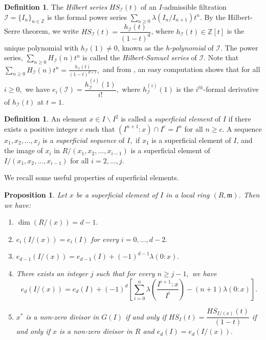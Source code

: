 \documentclass[reqno,a4paper,dvipsnames]{amsart}
\newcommand{\m}{\mathfrak{m} }
\newtheorem{proposition}[theorem]{Proposition}
\theoremstyle{definition}
\newtheorem{definition}[theorem]{Definition}
\begin{document}
  \begin{definition}
       The \textit{Hilbert series} $HS_{\mathcal{I}}(t)$ of an $I$-admissible filtration $\mathcal{I}=\{I_{n}\}_{n \in \mathbb Z}$  is the formal power series $\displaystyle \sum_{n \geq 0} \lambda(I_{n}/I_{n+1}) t^{n}$. 
    By the Hilbert-Serre theorem, we write 
    $ HS_{\mathcal{I}}(t)=\dfrac{h_{\mathcal{I}}(t)}{(1-t)^{d}}$,
where $h_{\mathcal{I}}(t) \in \mathbb{Z}[t]$ is the unique polynomial with $h_{\mathcal{I}}(1) \neq 0$, known as the \textit{h-polynomial} of $\mathcal{I}.$   The power series, $\displaystyle \sum_{n \geq 0} H_{\mathcal{I}}(n)t^{n}$ is called the \textit{Hilbert-Samuel series} of $\mathcal{I}.$ Note that $\displaystyle \sum_{n \geq 0} H_{\mathcal{I}}(n)t^{n}=\frac{h_{\mathcal{I}}(t)}{(1-t)^{d+1}},$
and from \cite[Page 9]{rv}, an easy computation shows that for all $i \geq 0,$ we have $e_{i}(\mathcal{I})=\dfrac{h^{(i)}_{\mathcal{I}}(1)}{i!},$
 where $h^{(i)}_{\mathcal{I}}(1)$ is the $i^{th}$-formal derivative of $h_{\mathcal{I}}(t)$ at $t=1.$
  \end{definition}

\begin{definition}
         An element $x\in I \backslash I^2$ is called a \textit{superficial element} of $I$ if there exists a positive integer $c$ such that $(I^{n+1}:x) \cap I^{c}=I^{n}$ for all $n \geq c.$  A sequence $x_{1},x_{2},\ldots,x_{j}$ is  a \textit{superficial sequence} of $I,$ if $x_{1}$ is a superficial element of $I$, and the image of  $x_{i}$  in $R/(x_{1},x_{2},\ldots,x_{i-1})$ is a superficial element of $I/(x_{1},x_{2},\ldots,x_{i-1})$ for all $i=2,\ldots,j.$  
\end{definition}

We recall some useful properties of superficial elements.

\begin{proposition}\cite[Proposition 1.2]{rv} \label{hibertcoeffsup}
Let $x$ be a superficial element of $I$ in a local ring $(R,\m)$. Then we have:
\begin{enumerate}[\normalfont(i)]
    \item \label{hibertcoeffsup-1}
    $\dim (R/(x))=d-1.$
    \item \label{hibertcoeffsup-2}
    $e_{i}(I/(x))=e_{i}(I)$ for every $i=0,\ldots,d-2.$
    \item \label{hibertcoeffsup-3}
    $e_{d-1}(I/(x))=e_{d-1}(I)+(-1)^{d-1}\lambda(0:x).$
    \item \label{hibertcoeffsup-4}
    There exists an integer $j$ such that for every $n \geq j-1,$ we have
    $$e_{d}(I/(x))=e_{d}(I)+(-1)^d\left[\displaystyle \sum_{i=0}^{n}\lambda\left(\frac{I^{i+1}:x}{I^{i}}\right)-(n+1)\lambda(0:x)\right].$$
    \item $x^*$ is a non-zero divisor in $G(I)$ if and only if $HS_{I}(t)=\dfrac{HS_{I/(x)}(t)}{(1-t)}$ if and only if $x$ is a non-zero divisor in $R$ and $e_{d}(I)=e_{d}(I/(x)).$
\end{enumerate}
\end{proposition}
\end{document}
